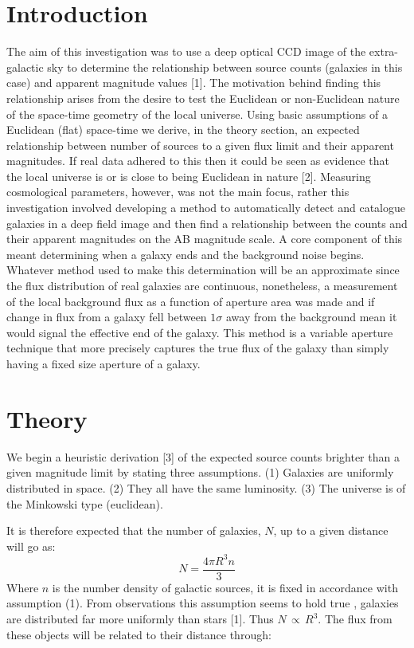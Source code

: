 \documentclass[journal]{IEEEtran}
\begin{document}
\section{Introduction}
The aim of this investigation was to use a deep optical CCD image of the extra-galactic sky to determine the relationship between source counts (galaxies in this case) and apparent magnitude values [1]. The motivation behind finding this relationship arises from the desire to test the Euclidean or non-Euclidean nature of the space-time geometry of the local universe. Using basic assumptions of a Euclidean (flat) space-time we derive, in the theory section, an expected relationship between number of sources to a given flux limit and their apparent magnitudes. If real data adhered to this then it could be seen as evidence that the local universe is or is close to being Euclidean in nature [2]. Measuring cosmological parameters, however, was not the main focus, rather this investigation involved developing a method to automatically detect and catalogue galaxies in a deep field image and then find a relationship between the counts and their apparent magnitudes on the AB magnitude scale. A core component of this meant determining when a galaxy ends and the background noise begins. Whatever method used to make this determination will be an approximate since the flux distribution of real galaxies are continuous, nonetheless, a measurement of the local background flux as a function of aperture area was made and if change in flux from a galaxy fell between $1\sigma$ away from the background mean it would signal the effective end of the galaxy. This method is a variable aperture technique that more precisely captures the true flux of the galaxy than simply having a fixed size aperture of a galaxy.
\section{Theory}
We begin a heuristic derivation [3] of the expected source counts brighter than a given magnitude limit by stating three assumptions. (1) Galaxies are uniformly distributed in space. (2) They all have the same luminosity. (3) The universe is of the Minkowski type (euclidean).\newline

\noindent It is therefore expected that the number of galaxies, $N$, up to a given distance will go as:
\begin{equation}
    N = \frac{4\pi R^{3}n}{3} \label{eq:1}
\end{equation}
 \noindent Where $n$ is the number density of galactic sources, it is fixed in accordance with assumption (1). From observations this assumption seems to hold true , galaxies are distributed far more uniformly than stars [1]. Thus $N\,\propto\,R^3$. The flux from these objects will be related to their distance through:
 
\end{document}
